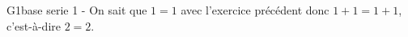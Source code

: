   G1base serie 1 - On sait que $1=1$ avec l’exercice précédent donc $1+1=1+1$,
  c’est-à-dire $2=2$.
